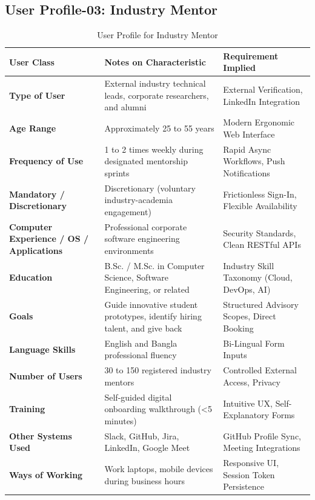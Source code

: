 \subsection{User Profile-03: Industry Mentor}
\label{subsec:profile_mentor}

\begin{table}[H]
\centering
\small
\begin{tabularx}{\textwidth}{|l|X|p{4.2cm}|}
\hline
\rowcolor{lightgray!40} \textbf{User Class} & \textbf{Notes on Characteristic} & \textbf{Requirement Implied} \\ \hline
\textbf{Type of User} & External industry technical leads, corporate researchers, and alumni & External Verification, LinkedIn Integration \\ \hline
\textbf{Age Range} & Approximately 25 to 55 years & Modern Ergonomic Web Interface \\ \hline
\textbf{Frequency of Use} & 1 to 2 times weekly during designated mentorship sprints & Rapid Async Workflows, Push Notifications \\ \hline
\textbf{Mandatory / Discretionary} & Discretionary (voluntary industry-academia engagement) & Frictionless Sign-In, Flexible Availability \\ \hline
\textbf{Computer Experience / OS / Applications} & Professional corporate software engineering environments & Security Standards, Clean RESTful APIs \\ \hline
\textbf{Education} & B.Sc. / M.Sc. in Computer Science, Software Engineering, or related & Industry Skill Taxonomy (Cloud, DevOps, AI) \\ \hline
\textbf{Goals} & Guide innovative student prototypes, identify hiring talent, and give back & Structured Advisory Scopes, Direct Booking \\ \hline
\textbf{Language Skills} & English and Bangla professional fluency & Bi-Lingual Form Inputs \\ \hline
\textbf{Number of Users} & 30 to 150 registered industry mentors & Controlled External Access, Privacy \\ \hline
\textbf{Training} & Self-guided digital onboarding walkthrough (<5 minutes) & Intuitive UX, Self-Explanatory Forms \\ \hline
\textbf{Other Systems Used} & Slack, GitHub, Jira, LinkedIn, Google Meet & GitHub Profile Sync, Meeting Integrations \\ \hline
\textbf{Ways of Working} & Work laptops, mobile devices during business hours & Responsive UI, Session Token Persistence \\ \hline
\end{tabularx}
\caption{User Profile for Industry Mentor}
\label{tab:user_profile_mentor}
\end{table}

